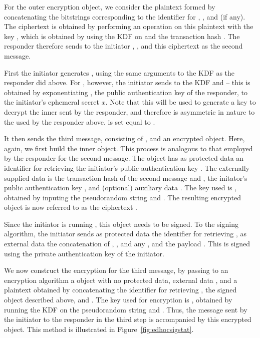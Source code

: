 {For the outer encryption object, we consider the plaintext formed by concatenating the bitstrings corresponding to the identifier for \mCredr, \mMactwo, and \mADtwo (if any). The ciphertext is obtained by performing an \mXor{} operation on this plaintext with the key \mKtwoe, which is obtained by using the KDF on \mPRKtwo and the transaction hash \mTHtwo. The responder therefore sends to the initiator \mGy, \mCr, and this ciphertext as the second message.

First the initiator generates \mPRKtwo, using the same arguments to the KDF as the responder did above. For \mPRKthree, however, the initiator sends to the KDF \mPRKtwo and \mGrx -- this \mGrx is obtained by exponentiating \mCredr, the public authentication key of the responder, to the initiator's ephemeral secret $x$. Note that this will be used to generate a key to decrypt the inner \mMactwo sent by the responder, and therefore is asymmetric in nature to the \mGrx used by the responder above. \mPRKfour is set equal to \mPRKthree. 

It then sends the third message, consisting of \mCr, and an encrypted object. Here, again, we first build the inner \mCose{} object. This process is analogous to that employed by the responder for the second message. The \mCose{} object has as protected data an identifier for retrieving the initiator's public authentication key \mCredi. The externally supplied data is the transaction hash \mTHthree of the second message and \mTHtwo,  the initator's public authentication key \mCredi, and (optional) auxiliary data \mADthree. The key used is \mKthreem, obtained by inputing the pseudorandom string \mPRKthree and \mTHthree. The resulting encrypted object is now referred to as the ciphertext \mMacthree. 

Since the initiator is running \mSig, this \mCose{} object needs to be signed. To the signing algorithm, the initiator sends as protected data the identifier for retrieving \mCredi, as external data the concatenation of \mTHthree, \mCredi, and any \mADthree, and the payload \mMacthree. This is signed using the private authentication key of the initiator.  

We now construct the encryption for the third message, by passing to an \mAead{} encryption algorithm a \mCose{} object with no protected data, external data \mTHthree, and a plaintext obtained by concatenating the identifier for retrieving \mCredi, the signed object described above, and \mADthree. The key used for encryption is \mKthreeae, obtained by running the KDF on the pseudorandom string \mPRKthree and \mTHtwo. Thus, the message sent by the initiator to the responder in the third step is \mCr accompanied by this encrypted object. This method is illustrated in Figure~\ref{fig:edhocsigstat}.

}
